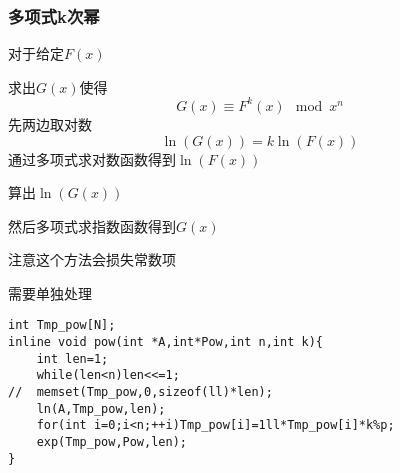 \documentclass{ctexart}
\begin{document}
\subsubsection{多项式k次幂}
对于给定$F(x)$

求出$G(x)$使得
$$
G(x)\equiv F^k(x) \mod x^n
$$
先两边取对数
$$
\ln(G(x))=k\ln(F(x))
$$
通过多项式求对数函数得到$\ln(F(x))$

算出$\ln(G(x))$

然后多项式求指数函数得到$G(x)$

注意这个方法会损失常数项

需要单独处理
\begin{lstlisting}
int Tmp_pow[N];
inline void pow(int *A,int*Pow,int n,int k){
	int len=1;
	while(len<n)len<<=1;
//	memset(Tmp_pow,0,sizeof(ll)*len);
	ln(A,Tmp_pow,len);
	for(int i=0;i<n;++i)Tmp_pow[i]=1ll*Tmp_pow[i]*k%p;
	exp(Tmp_pow,Pow,len);
}
\end{lstlisting}
\end{document}
